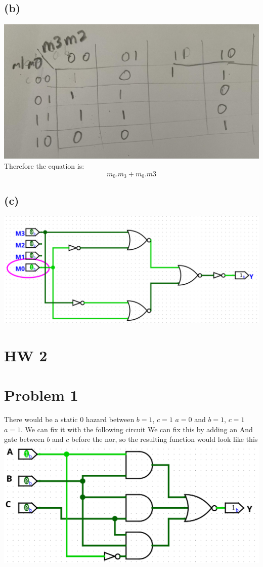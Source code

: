 \documentclass[12pt]{article}
\begin{document}
\subsection*{(b)}
\includegraphics[scale=0.15]{Problem7Kmap.jpg}\\
Therefore the equation is:
$$\boxed{m_0.\overline{m_3}+\overline{m_0}.m3}$$
\subsection*{(c)}
\includegraphics[scale=0.25]{Problem7Partc.png}
\section*{HW 2}
\section*{Problem 1}
There would be a static 0 hazard between $b=1$, $c=1$ $a=0$ and $b=1$, $c=1$ $a=1$. We can fix it with the following circuit
We can fix this by adding an And gate between $b$ and $c$ before the nor, so the resulting function would look like this
\includegraphics[scale=0.25]{Problem1.png}
\end{document}
